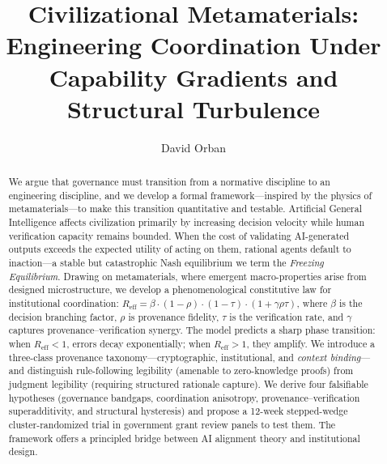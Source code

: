 \documentclass[runningheads]{llncs}
\begin{document}
\title{Civilizational Metamaterials: Engineering Coordination Under Capability Gradients and Structural Turbulence}

\author{David Orban}



\maketitle

\begin{abstract}
We argue that governance must transition from a normative discipline to an engineering discipline, and we develop a formal framework---inspired by the physics of metamaterials---to make this transition quantitative and testable. Artificial General Intelligence affects civilization primarily by increasing decision velocity while human verification capacity remains bounded. When the cost of validating AI-generated outputs exceeds the expected utility of acting on them, rational agents default to inaction---a stable but catastrophic Nash equilibrium we term the \emph{Freezing Equilibrium}. Drawing on metamaterials, where emergent macro-properties arise from designed microstructure, we develop a phenomenological constitutive law for institutional coordination: $R_{\mathrm{eff}} = \beta \cdot (1-\rho) \cdot (1-\tau) \cdot (1+\gamma \rho \tau)$, where $\beta$ is the decision branching factor, $\rho$ is provenance fidelity, $\tau$ is the verification rate, and $\gamma$ captures provenance--verification synergy. The model predicts a sharp phase transition: when $R_{\mathrm{eff}} < 1$, errors decay exponentially; when $R_{\mathrm{eff}} > 1$, they amplify. We introduce a three-class provenance taxonomy---cryptographic, institutional, and \emph{context binding}---and distinguish rule-following legibility (amenable to zero-knowledge proofs) from judgment legibility (requiring structured rationale capture). We derive four falsifiable hypotheses (governance bandgaps, coordination anisotropy, provenance--verification superadditivity, and structural hysteresis) and propose a 12-week stepped-wedge cluster-randomized trial in government grant review panels to test them. The framework offers a principled bridge between AI alignment theory and institutional design.

\end{abstract}
\end{document}
